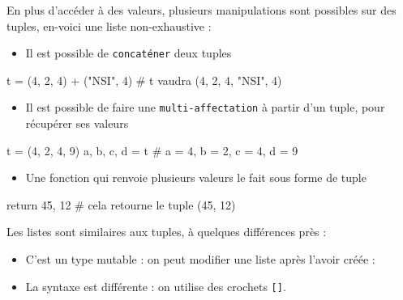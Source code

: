 \documentclass[11pt]{article}
\begin{document}
	En plus d'accéder à des valeurs, plusieurs manipulations sont possibles sur des tuples, en-voici une liste non-exhaustive :
	
	\begin{itemize}
		\item Il est possible de \texttt{concaténer} deux tuples
	\end{itemize}
	
	\begin{python}
		t = (4, 2, 4) + ("NSI", 4)	# t vaudra (4, 2, 4, "NSI", 4)\end{python}
	
	\begin{itemize}
		\item Il est possible de faire une \texttt{multi-affectation} à partir d'un tuple, pour récupérer ses valeurs
	\end{itemize}
	
	\begin{python}
		t = (4, 2, 4, 9)
		a, b, c, d = t	# a = 4, b = 2, c = 4, d = 9\end{python}
	
	\begin{itemize}
		\item Une fonction qui renvoie plusieurs valeurs le fait sous forme de tuple
	\end{itemize}
	
	\begin{python}
		return 45, 12	# cela retourne le tuple (45, 12)\end{python}
		
		
	
	
	Les listes sont similaires aux tuples, à quelques différences près :
	
	\begin{itemize}
		\item C'est un type mutable : on peut modifier une liste après l'avoir créée :
		\item La syntaxe est différente : on utilise des crochets \texttt{[]}.
	\end{itemize}
	
\end{document}
